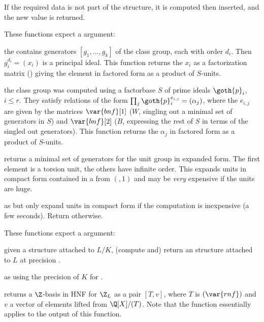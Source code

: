 
If the required data is not part of the structure, it is computed then
inserted, and the new value is returned.

These functions expect a  argument:

 the 
contains generators $[g_1,\ldots,g_k]$ of the class group, each with order
$d_i$. Then $g_i^{d_i} = (x_i)$ is a principal ideal. This function returns
the $x_i$ as a factorization matrix () giving the element in
factored form as a product of $S$-units.

 the class group was
computed using a factorbase $S$ of prime ideals $\goth{p}_i$, $i \leq r$.
They satisfy relations of the form $\prod_j \goth{p}_i^{e_{i,j}} = (\alpha_j)$,
where the $e_{i,j}$ are given by the matrices $\var{bnf}[1]$ ($W$, singling
out a minimal set of generators in $S$) and $\var{bnf}[2]$ ($B$, expressing the
rest of $S$ in terms of the singled out generators). This function returns the
$\alpha_j$ in factored form as a product of $S$-units.

 returns a minimal set of generators
for the unit group in expanded form. The first element is a torsion unit, the
others have infinite order. This expands units in compact form contained
in a  from $(,1)$ and may be \emph{very} expensive
if the units are huge.

 as  but only
expand units in compact form if the computation is inexpensive (a few seconds).
Return  otherwise.

These functions expect a  argument:

 given a  structure
attached to $L/K$, (compute and) return an  structure attached to $L$
at precision .

 as  using the precision
of $K$ for .

 returns a $\Z$-basis in HNF for $\Z_L$ as a
pair $[T, v]$, where $T$ is $(\var{rnf})$ and $v$
a vector of elements lifted from $\Q[X]/(T)$. Note that the function
 essentially applies  to the output of this
function.

